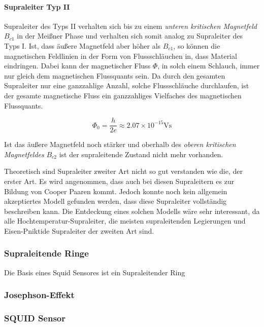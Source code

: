 \documentclass{article}
\begin{document}
\paragraph{Supraleiter Typ II}

Supraleiter des Typs II verhalten sich bis zu einem \textit{unteren kritischen Magnetfeld} $B_{c1}$ in der Meißner Phase und verhalten sich somit analog zu Supraleiter des Typs I. Ist, dass äußere Magnetfeld aber höher als $B_{c1}$, so können die magnetischen Feldlinien in der Form von Flussschläuchen in, dass Material eindringen. Dabei kann der magnetischer Fluss $\Phi$, in solch einem Schlauch, immer nur gleich dem magnetischen Flussquants sein. \cite{fprak_manual} \cite{wiki-superconducter}
Da durch den gesamten Supraleiter nur eine ganzzahlige Anzahl, solche Flussschläuche durchlaufen, ist der gesamte magnetische Fluss ein ganzzahliges Vielfaches des magnetischen Flussquants.

\begin{equation}
    \Phi_0 = \frac{h}{2e} \approx 2.07 \times 10^{-15} \mathrm{Vs}
\end{equation}

Ist das äußere Magnetfeld noch stärker und oberhalb des \textit{oberen kritischen Magnetfeldes} $B_{c2}$ ist der supraleitende Zustand nicht mehr vorhanden.

Theoretisch sind Supraleiter zweiter Art nicht so gut verstanden wie die, der erster Art. Es wird angenommen, dass auch bei diesen Supraleitern es zur Bildung von Cooper Paaren kommt. Jedoch konnte noch kein allgemein akzeptiertes Modell gefunden werden, dass diese Supraleiter vollständig beschreiben kann. Die Entdeckung eines solchen Modells wäre sehr interessant, da alle Hochtemperatur-Supraleiter, die meisten supraleitenden Legierungen und Eisen-Pniktide Supraleiter der zweiten Art sind.

\subsubsection{Supraleitende Ringe}
Die Basis eines Squid Sensores ist ein Supraleitender Ring

\subsubsection{Josephson-Effekt}

\subsubsection{SQUID Sensor}
\end{document}
